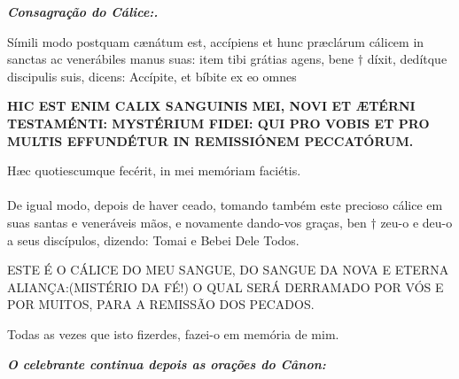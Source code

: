 \begin{flushleft}
	\textbf{\textit{Consagração do Cálice:.}}
\end{flushleft}
\begin{multicols}{2}
	\noindent Símili modo postquam cænátum est, accípiens et hunc præclárum cálicem in sanctas ac venerábiles manus suas: item tibi grátias agens, bene $\dag$ díxit, dedítque discipulis suis, dicens: Accípite, et bíbite ex eo omnes
	\begin{center}
		\textbf{HIC EST ENIM CALIX SANGUINIS
			MEI, NOVI ET ÆTÉRNI
			TESTAMÉNTI: MYSTÉRIUM FIDEI:
			QUI PRO VOBIS ET PRO MULTIS
			EFFUNDÉTUR IN REMISSIÓNEM
			PECCATÓRUM.}
	\end{center}
	Hæc quotiescumque fecérit, in mei
	memóriam faciétis.
	\\
	\\ De igual modo, depois de haver ceado, tomando também este precioso cálice em suas santas e veneráveis mãos, e novamente dando-vos graças, ben $\dag$ zeu-o e deu-o a seus discípulos, dizendo: Tomai e Bebei Dele Todos.
	\begin{center}
		ESTE É O CÁLICE DO MEU SANGUE,
		DO SANGUE DA NOVA E ETERNA
		ALIANÇA:(MISTÉRIO DA FÉ!) O
		QUAL SERÁ DERRAMADO POR VÓS
		E POR MUITOS, PARA A REMISSÃO
		DOS PECADOS.
	\end{center} 
	Todas as vezes que isto fizerdes, fazei-o
	em memória de mim.
\end{multicols}
\begin{flushleft}
	\textbf{\textit{O celebrante continua depois as orações do Cânon:}}
\end{flushleft}
